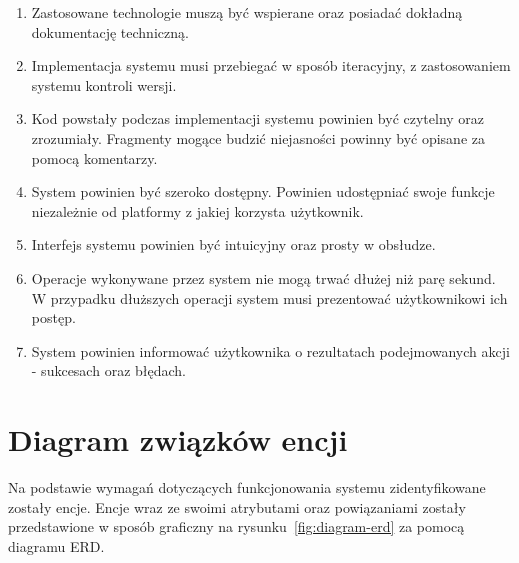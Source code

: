 \begin{enumerate}

\item Zastosowane technologie muszą być wspierane oraz posiadać dokładną dokumentację techniczną.

\item Implementacja systemu musi przebiegać w sposób iteracyjny, z zastosowaniem systemu kontroli wersji.

\item Kod powstały podczas implementacji systemu powinien być czytelny oraz zrozumiały. Fragmenty mogące budzić niejasności powinny być opisane za pomocą komentarzy.

\item System powinien być szeroko dostępny. Powinien udostępniać swoje funkcje niezależnie od platformy z jakiej korzysta użytkownik. 

\item Interfejs systemu powinien być intuicyjny oraz prosty w obsłudze.

\item Operacje wykonywane przez system nie mogą trwać dłużej niż parę sekund. W przypadku dłuższych operacji system musi prezentować użytkownikowi ich postęp.

\item System powinien informować użytkownika o rezultatach podejmowanych akcji - sukcesach oraz błędach.

\end{enumerate}


\section{Diagram związków encji}

Na podstawie wymagań dotyczących funkcjonowania systemu zidentyfikowane zostały encje. Encje wraz ze swoimi atrybutami oraz powiązaniami zostały przedstawione w sposób graficzny na rysunku~\ref{fig:diagram-erd} za pomocą diagramu ERD.

